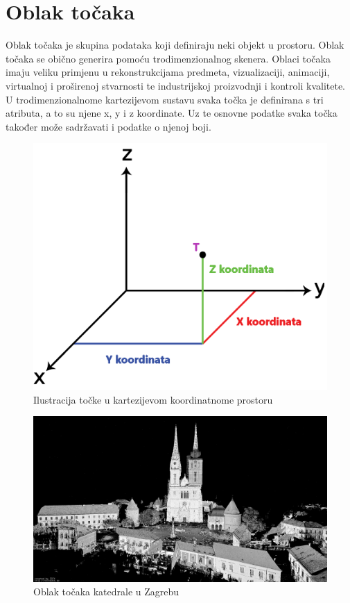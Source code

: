 \section{Oblak točaka}

Oblak točaka je skupina podataka koji definiraju neki objekt u prostoru. Oblak točaka se obično generira pomoću trodimenzionalnog skenera. Oblaci točaka imaju veliku primjenu u rekonstrukcijama predmeta, vizualizaciji, animaciji, virtualnoj i proširenoj stvarnosti te industrijskoj proizvodnji i kontroli kvalitete. U trodimenzionalnome kartezijevom sustavu svaka točka je definirana s tri atributa, a to su njene x, y i z koordinate. Uz te osnovne podatke svaka točka također može sadržavati i podatke o njenoj boji.

\begin{figure}[h!]
  \centering
  \includegraphics[scale=0.3]{images/point-coordinates.png}
  \caption{Ilustracija točke u kartezijevom koordinatnome prostoru}
  \label{fig:point_coordinates}
\end{figure}

\begin{figure}[h!]
  \centering
  \includegraphics[scale=0.2]{images/katedrala-point-cloud.jpg}
  \caption{Oblak točaka katedrale u Zagrebu}
  \label{fig:point_cloud_exmaple}
\end{figure}


